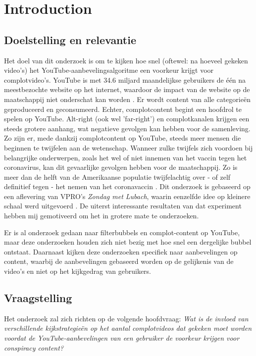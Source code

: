 \documentclass[../main.tex]{subfiles}
\begin{document}
\section{Introduction}
\subsection{Doelstelling en relevantie}
Het doel van dit onderzoek is om te kijken hoe snel (oftewel: na hoeveel gekeken video’s) het YouTube-aanbevelingsalgoritme een voorkeur krijgt voor complotvideo's. YouTube is met 34.6 miljard maandelijkse gebruikers de één na meestbezochte website op het internet, waardoor de impact van de website op de maatschappij niet onderschat kan worden \citep{neufeld_2021}. Er wordt content van alle categorieën geproduceerd en geconsumeerd. Echter, complotcontent begint een hoofdrol te spelen op YouTube. Alt-right (ook wel 'far-right') en complotkanalen krijgen een steeds grotere aanhang, wat negatieve gevolgen kan hebben voor de samenleving. Zo zijn er, mede dankzij complotcontent op YouTube, steeds meer mensen die beginnen te twijfelen aan de wetenschap. Wanneer zulke twijfels zich voordoen bij belangrijke onderwerpen, zoals het wel of niet innemen van het vaccin tegen het coronavirus, kan dit gevaarlijke gevolgen hebben voor de maatschappij. Zo is meer dan de helft van de Amerikaanse populatie twijfelachtig over - of zelf definitief tegen - het nemen van het coronavaccin \citep{rosenbaum2021escaping}. Dit onderzoek is gebaseerd op een aflevering van VPRO's \textit{Zondag met Lubach}, waarin eenzelfde idee op kleinere schaal werd uitgevoerd \citep{lubach_2020}. De uiterst interessante resultaten van dat experiment hebben mij gemotiveerd om het in grotere mate te onderzoeken. 

Er is al onderzoek gedaan naar filterbubbels en complot-content op YouTube, maar deze onderzoeken houden zich niet bezig met hoe snel een dergelijke bubbel ontstaat. Daarnaast kijken deze onderzoeken specifiek naar aanbevelingen op content, waarbij de aanbevelingen gebaseerd worden op de gelijkenis van de video’s en niet op het kijkgedrag van gebruikers. 

\subsection{Vraagstelling}
Het onderzoek zal zich richten op de volgende hoofdvraag:
\textit{Wat is de invloed van verschillende kijkstrategieën op het aantal complotvideos dat gekeken moet worden voordat de YouTube-aanbevelingen van een gebruiker de voorkeur krijgen voor conspiracy content?}
\end{document}
